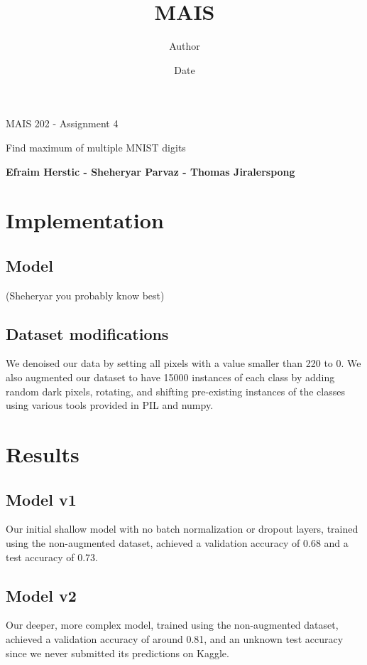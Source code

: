\documentclass[12pt]{article}
\title{MAIS }
\author{Author}
\date{Date}
\begin{document}
\begin{titlepage}
   \begin{center}
       \vspace*{1cm}

       {\Huge MAIS 202 - Assignment 4}
    
       \vspace{0.5cm}
        Find maximum of multiple MNIST digits
            
       \vspace{1.5cm}

       \textbf{Efraim Herstic - Sheheryar Parvaz - Thomas Jiralerspong}

            
   \end{center}
\end{titlepage}
\tableofcontents
\newpage
\section{Implementation}
\subsection{Model}
(Sheheryar you probably know best)

\subsection{Dataset modifications}
We denoised our data by setting all pixels with a value smaller than 220 to 0. 
We also augmented our dataset to have 15000 instances of each class by adding random dark pixels, rotating, and shifting pre-existing instances of the classes using various tools provided in PIL and numpy.
\section{Results}
\subsection{Model v1}
Our initial shallow model with no batch normalization or dropout layers, trained using the non-augmented dataset, achieved a validation accuracy of 0.68 and a test accuracy of 0.73.
\subsection{Model v2}
Our deeper, more complex model, trained using the non-augmented dataset, achieved a validation accuracy of around 0.81, and an unknown test accuracy since we never submitted its predictions on Kaggle.
\end{document}

